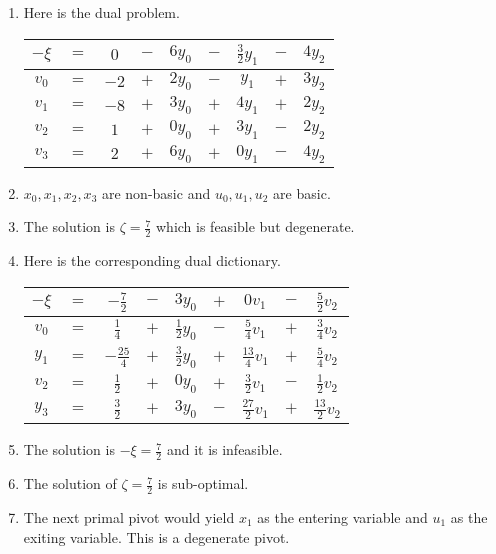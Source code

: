 \documentclass[12pt,oneside]{amsart}
\numberwithin{equation}{section}
\numberwithin{figure}{section}
\theoremstyle{plain}
\theoremstyle{definition}
\begin{document}
\begin{enumerate}
  \item Here is the dual problem. \\
    \begin{center}\begin{tabular}{|ccccccccc|}
      \hline
      $-\xi$ & $=$ & $0$ & $-$ & $6y_0$ & $-$ & $\frac{3}{2}y_1$ & $-$ & $4y_2$ \\
      \hline
      $v_0$ & $=$ & $-2$ & $+$ & $2y_0$ & $-$ & $y_1$            & $+$ & $3y_2$ \\
      $v_1$ & $=$ & $-8$ & $+$ & $3y_0$ & $+$ & $4y_1$           & $+$ & $2y_2$ \\
      $v_2$ & $=$ & $1$  & $+$ & $0y_0$ & $+$ & $3y_1$           & $-$ & $2y_2$ \\
      $v_3$ & $=$ & $2$  & $+$ & $6y_0$ & $+$ & $0y_1$           & $-$ & $4y_2$ \\
      \hline
    \end{tabular}\end{center}
  \item $x_0,x_1,x_2,x_3$ are non-basic and $u_0,u_1,u_2$ are basic. \\
  \item The solution is $\zeta = \frac{7}{2}$ which is feasible but degenerate. \\
  \item Here is the corresponding dual dictionary. \\
    \begin{center}\begin{tabular}{|ccccccccc|}
      \hline
      $-\xi$ & $=$ & $-\frac{7}{2}$ & $-$ & $3y_0$           & $+$ & $0v_1$            & $-$ & $\frac{5}{2}v_2$  \\
      \hline
      $v_0$ & $=$ & $\frac{1}{4}$   & $+$ & $\frac{1}{2}y_0$ & $-$ & $\frac{5}{4}v_1$  & $+$ & $\frac{3}{4}v_2$  \\
      $y_1$ & $=$ & $-\frac{25}{4}$ & $+$ & $\frac{3}{2}y_0$ & $+$ & $\frac{13}{4}v_1$ & $+$ & $\frac{5}{4}v_2$  \\
      $v_2$ & $=$ & $\frac{1}{2}$   & $+$ & $0y_0$           & $+$ & $\frac{3}{2}v_1$  & $-$ & $\frac{1}{2}v_2$  \\
      $y_3$ & $=$ & $\frac{3}{2}$   & $+$ & $3y_0$           & $-$ & $\frac{27}{2}v_1$ & $+$ & $\frac{13}{2}v_2$ \\
      \hline
    \end{tabular}\end{center}
  \item The solution is $-\xi = \frac{7}{2}$ and it is infeasible. \\
  \item The solution of $\zeta = \frac{7}{2}$ is sub-optimal. \\
  \item The next primal pivot would yield $x_1$ as the entering variable and $u_1$ 
    as the exiting variable. This is a degenerate pivot. \\
\end{enumerate}
\end{document}
